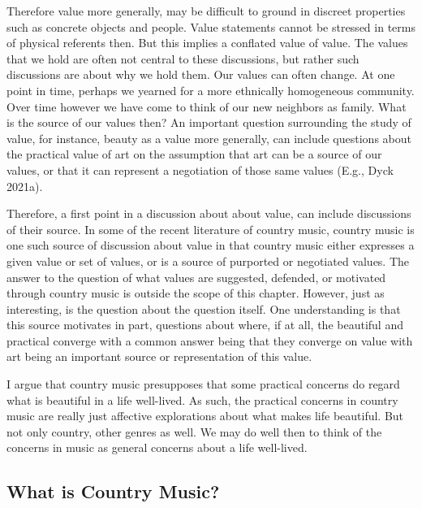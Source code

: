 \documentclass[
  letterpaper,
  DIV=11,
  numbers=noendperiod]{scrartcl}
\theoremstyle{remark}
\begin{document}
Therefore value more generally, may be difficult to ground in discreet
properties such as concrete objects and people. Value statements cannot
be stressed in terms of physical referents then. But this implies a
conflated value of value. The values that we hold are often not central
to these discussions, but rather such discussions are about why we hold
them. Our values can often change. At one point in time, perhaps we
yearned for a more ethnically homogeneous community. Over time however
we have come to think of our new neighbors as family. What is the source
of our values then? An important question surrounding the study of
value, for instance, beauty as a value more generally, can include
questions about the practical value of art on the assumption that art
can be a source of our values, or that it can represent a negotiation of
those same values (E.g., Dyck 2021a).

Therefore, a first point in a discussion about about value, can include
discussions of their source. In some of the recent literature of country
music, country music is one such source of discussion about value in
that country music either expresses a given value or set of values, or
is a source of purported or negotiated values. The answer to the
question of what values are suggested, defended, or motivated through
country music is outside the scope of this chapter. However, just as
interesting, is the question about the question itself. One
understanding is that this source motivates in part, questions about
where, if at all, the beautiful and practical converge with a common
answer being that they converge on value with art being an important
source or representation of this value.

I argue that country music presupposes that some practical concerns do
regard what is beautiful in a life well-lived. As such, the practical
concerns in country music are really just affective explorations about
what makes life beautiful. But not only country, other genres as well.
We may do well then to think of the concerns in music as general
concerns about a life well-lived.

\subsection{What is Country Music?}\label{what-is-country-music}
\end{document}
